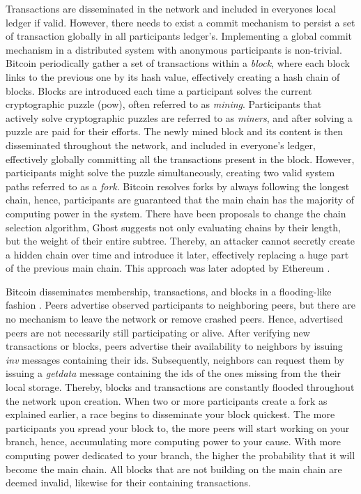 \documentclass[USenglish]{uit-thesis}
\begin{document}
Transactions are disseminated in the network and included in everyones local ledger if valid.
However, there needs to exist a commit mechanism to persist a set of transaction globally in all participants ledger's.
Implementing a global commit mechanism in a distributed system with anonymous participants is non-trivial. 
Bitcoin periodically gather a set of transactions within a \textit{block}, where each block links to the previous one by its hash value, effectively creating a hash chain of blocks.
Blocks are introduced each time a participant solves the current cryptographic puzzle (\gls{pow}), often referred to as \textit{mining}.
Participants that actively solve cryptographic puzzles are referred to as \textit{miners}, and after solving a puzzle are paid for their efforts.
The newly mined block and its content is then disseminated throughout the network, and included in everyone's ledger, effectively globally committing all the transactions present in the block.
However, participants might solve the puzzle simultaneously, creating two valid system paths referred to as a \textit{fork}.
Bitcoin resolves forks by always following the longest chain, hence, participants are guaranteed that the main chain has the majority of computing power in the system.
There have been proposals to change the chain selection algorithm, Ghost \cite{ghost} suggests not only evaluating chains by their length, but the weight of their entire subtree. 
Thereby, an attacker cannot secretly create a hidden chain over time and introduce it later, effectively replacing a huge part of the previous main chain.
This approach was later adopted by Ethereum \cite{ether}.


Bitcoin disseminates membership, transactions, and blocks in a flooding-like fashion \cite{propa}.
Peers advertise observed participants to neighboring peers, but there are no mechanism to leave the network or remove crashed peers.
Hence, advertised peers are not necessarily still participating or alive.
After verifying new transactions or blocks, peers advertise their availability to neighbors by issuing \textit{inv} messages containing their ids.
Subsequently, neighbors can request them by issuing a \textit{getdata} message containing the ids of the ones missing from the their local storage. 
Thereby, blocks and transactions are constantly flooded throughout the network upon creation.
When two or more participants create a fork as explained earlier, a race begins to disseminate your block quickest.
The more participants you spread your block to, the more peers will start working on your branch, hence, accumulating more computing power to your cause.
With more computing power dedicated to your branch, the higher the probability that it will become the main chain.
All blocks that are not building on the main chain are deemed invalid, likewise for their containing transactions.
\end{document}
